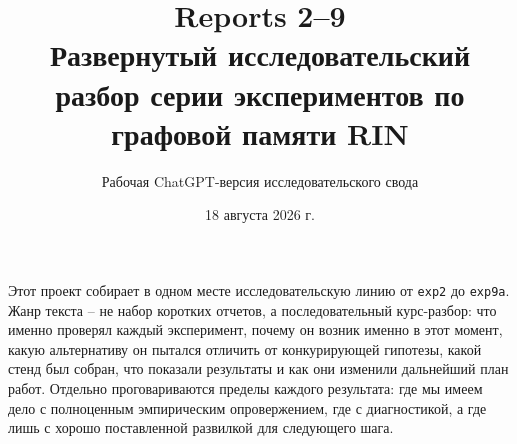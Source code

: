 \documentclass[11pt,a4paper]{extbook}
\title{Reports 2--9\\[0.4em]\large Развернутый исследовательский разбор серии экспериментов по графовой памяти RIN}
\author{Рабочая ChatGPT-версия исследовательского свода}
\date{18 августа 2026 г.}
\begin{document}
\frontmatter
\maketitle

\begin{center}
\begin{minipage}{0.88\textwidth}\small
Этот проект собирает в одном месте исследовательскую линию от \texttt{exp2} до
\texttt{exp9a}. Жанр текста -- не набор коротких отчетов, а последовательный
курс-разбор: что именно проверял каждый эксперимент, почему он возник именно в
этот момент, какую альтернативу он пытался отличить от конкурирующей гипотезы,
какой стенд был собран, что показали результаты и как они изменили дальнейший
план работ. Отдельно проговариваются пределы каждого результата: где мы имеем
дело с полноценным эмпирическим опровержением, где с диагностикой, а где лишь с
хорошо поставленной развилкой для следующего шага.
\end{minipage}
\end{center}

\tableofcontents

\mainmatter









\end{document}
